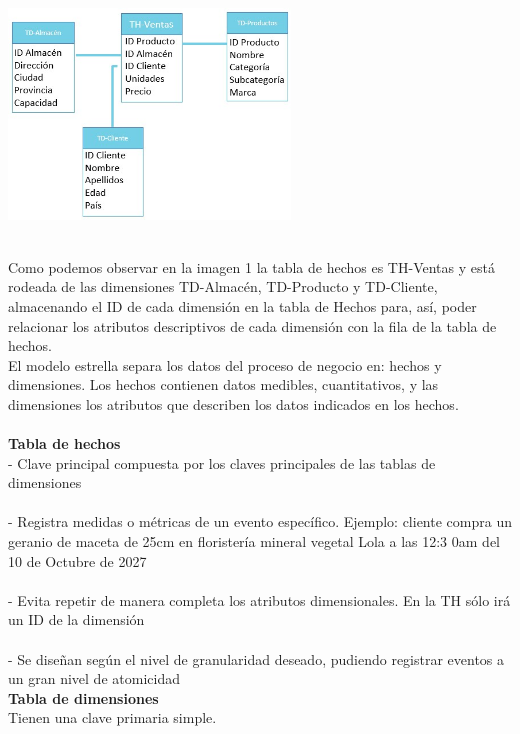 \documentclass[twoside,twocolumn]{article}
\begin{document}
\begin{enumerate}
\includegraphics[width=7.5cm]{Imagenes/modelo2}

\textbf{}\\
Como podemos observar en la imagen 1 la tabla de hechos es TH-Ventas y está rodeada de las dimensiones TD-Almacén, TD-Producto y TD-Cliente, almacenando el ID de cada dimensión en la tabla de Hechos para, así, poder relacionar los atributos descriptivos de cada dimensión con la fila de la tabla de hechos.\textbf{}\\

El modelo estrella separa los datos del proceso de negocio en: hechos y dimensiones. Los hechos contienen datos medibles, cuantitativos, y las dimensiones los atributos que describen los datos indicados en los hechos.\textbf{}\\
\textbf{}\\
\textbf{Tabla de hechos}\\
- Clave principal compuesta por los claves principales de las tablas de dimensiones\\
\textbf{}\\
- Registra medidas o métricas de un evento específico. Ejemplo: cliente compra un geranio de maceta de 25cm en floristería mineral vegetal Lola a las 12:3 0am del 10 de Octubre de 2027\\
\textbf{}\\
- Evita repetir de manera completa los atributos dimensionales. En la TH sólo irá un ID de la dimensión\\
\textbf{}\\
- Se diseñan según el nivel de granularidad deseado, pudiendo registrar eventos a un gran nivel de atomicidad\\

\textbf{Tabla de dimensiones}\\
Tienen una clave primaria simple.\textbf{}\\


\end{enumerate}
\end{document}
